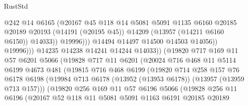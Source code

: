 \begin{lexlean}{RustStd}
\begin{coremodule}
                                  @242
                                  @14
                                  @6165
                                  (@20167
                                    @45
                                    @118
                                    @14
                                    @5081
                                    @5091
                                    @1135
                                    @6160
                                    @20185
                                    @20189
                                    @20193
                                    (@14191 (@20195 @45))
                                    @14209
                                    (@13957 (@14211 @6160 @6150))
                                    @14033))
                                @19996)))
                          @14494
                          @14497
                          @14500
                          @14503
                          @14056))
                      @19996)))
                @14235
                @14238
                @14241
                @14244
                @14033))
            (@19820
              @717
              @169
              @11
              @57
              @6201
              @5066
              (@19828
                @717
                @11
                @6201
                (@20024
                  @716
                  @468
                  @11
                  @5114
                  @6199
                  @4673
                  @481
                  (@19815
                    @716
                    @468
                    @6199
                    (@19820
                      @714
                      @258
                      @157
                      @76
                      @6178
                      @6198
                      (@19984 @713 @6178 (@13952 (@13953 @6178)) (@13957 (@13959 @713 @157)))
                      (@19820
                        @256
                        @169
                        @11
                        @57
                        @6196
                        @5066
                        (@19828
                          @256
                          @11
                          @6196
                          (@20167
                            @52
                            @118
                            @11
                            @5081
                            @5091
                            @1163
                            @6191
                            @20185
                            @20189

\end{coremodule}
\end{lexlean}
